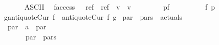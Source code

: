 \begin{isabellebody}
\ \ \ {\isacharparenleft}{\isachardoublequoteopen}{\isacharunderscore}{\isasymrightarrow}{\isacharunderscore}{\isachardoublequoteclose}\ {\isacharbrackleft}{}{}{\isacharcomma}{}{}{}{}{\isacharbrackright}\ {}{}{}{\isacharparenright}\isanewline
\isanewline
{}\isamarkupfalse%
\ {\isacharparenleft}ASCII{\isacharparenright}\isanewline
\ \ {\isachardoublequoteopen}{\isacharunderscore}faccess{\isachardoublequoteclose}\ \ {\isacharcolon}{\isacharcolon}\ {\isachardoublequoteopen}{\isacharprime}ref\ {\isasymRightarrow}\ {\isacharparenleft}{\isacharprime}ref\ {\isasymRightarrow}\ {\isacharprime}v{\isacharparenright}\ {\isasymRightarrow}\ {\isacharprime}v{\isachardoublequoteclose}\isanewline
\ \ \ {\isacharparenleft}{\isachardoublequoteopen}{\isacharunderscore}{\isacharminus}{\isachargreater}{\isacharunderscore}{\isachardoublequoteclose}\ {\isacharbrackleft}{}{}{\isacharcomma}{}{}{}{}{\isacharbrackright}\ {}{}{}{\isacharparenright}\isanewline
\isanewline
{}\isamarkupfalse%
\ \isanewline
\isanewline
\ {\isachardoublequoteopen}p{\isasymrightarrow}f{\isachardoublequoteclose}\ \ \ \ \ \ \ \ {\isacharequal}{\isachargreater}\ \ {\isachardoublequoteopen}f\ p{\isachardoublequoteclose}\isanewline
\ {\isachardoublequoteopen}g{\isasymrightarrow}{\isacharparenleft}{\isacharunderscore}antiquoteCur\ f{\isacharparenright}{\isachardoublequoteclose}\ {\isacharless}{\isacharequal}\ {\isachardoublequoteopen}{\isacharunderscore}antiquoteCur\ f\ g{\isachardoublequoteclose}\isanewline
\isanewline
\isanewline
{}\isamarkupfalse%
\ par\ \ pars\ \ actuals\isanewline
\isanewline
{}\isamarkupfalse%
\ \isanewline
\ \ {\isachardoublequoteopen}{\isacharunderscore}par{\isachardoublequoteclose}\ {\isacharcolon}{\isacharcolon}\ {\isachardoublequoteopen}{\isacharprime}a\ {\isasymRightarrow}\ par{\isachardoublequoteclose}\ \ \ \ \ \ \ \ \ \ \ \ \ \ \ \ \ \ \ \ \ \ \ \ \ \ \ \ \ \ \ \ {\isacharparenleft}{\isachardoublequoteopen}{\isacharunderscore}{\isachardoublequoteclose}{\isacharparenright}\isanewline
\ \ {\isachardoublequoteopen}{\isachardoublequoteclose}\ \ \ \ {\isacharcolon}{\isacharcolon}\ {\isachardoublequoteopen}par\ {\isasymRightarrow}\ pars{\isachardoublequoteclose}\ \ \ \ \ \ \ \ \ \ \ \ \ \ \ \ \ \ \ \ \ \ \ \ \ \ \ \ \ \ \ {\isacharparenleft}{\isachardoublequoteopen}{\isacharunderscore}{\isachardoublequoteclose}{\isacharparenright}\isanewline

\end{isabellebody}
